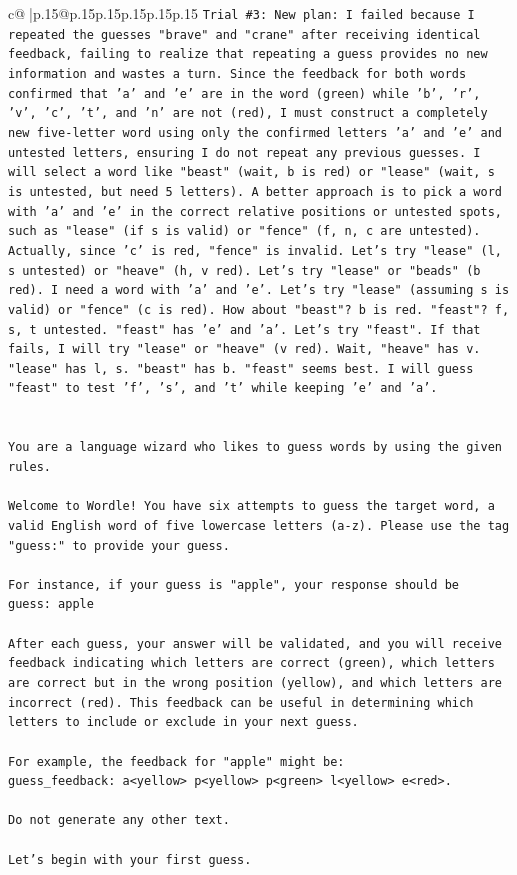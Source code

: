 \documentclass{article}
\begin{document}
{\begin{supertabular}{c@{$\;$}|p{.15\linewidth}@{}p{.15\linewidth}p{.15\linewidth}p{.15\linewidth}p{.15\linewidth}p{.15\linewidth}}
{{{\texttt{Trial \#3: New plan: I failed because I repeated the guesses "brave" and "crane" after receiving identical feedback, failing to realize that repeating a guess provides no new information and wastes a turn. Since the feedback for both words confirmed that 'a' and 'e' are in the word (green) while 'b', 'r', 'v', 'c', 't', and 'n' are not (red), I must construct a completely new five{-}letter word using only the confirmed letters 'a' and 'e' and untested letters, ensuring I do not repeat any previous guesses. I will select a word like "beast" (wait, b is red) or "lease" (wait, s is untested, but need 5 letters). A better approach is to pick a word with 'a' and 'e' in the correct relative positions or untested spots, such as "lease" (if s is valid) or "fence" (f, n, c are untested). Actually, since 'c' is red, "fence" is invalid. Let's try "lease" (l, s untested) or "heave" (h, v red). Let's try "lease" or "beads" (b red). I need a word with 'a' and 'e'. Let's try "lease" (assuming s is valid) or "fence" (c is red). How about "beast"? b is red. "feast"? f, s, t untested. "feast" has 'e' and 'a'. Let's try "feast". If that fails, I will try "lease" or "heave" (v red). Wait, "heave" has v. "lease" has l, s. "beast" has b. "feast" seems best. I will guess "feast" to test 'f', 's', and 't' while keeping 'e' and 'a'.} \\
\\ 
\\ 
\texttt{You are a language wizard who likes to guess words by using the given rules.} \\
\\ 
\texttt{Welcome to Wordle! You have six attempts to guess the target word, a valid English word of five lowercase letters (a{-}z). Please use the tag "guess:" to provide your guess.} \\
\\ 
\texttt{For instance, if your guess is "apple", your response should be} \\
\texttt{guess: apple} \\
\\ 
\texttt{After each guess, your answer will be validated, and you will receive feedback indicating which letters are correct (green), which letters are correct but in the wrong position (yellow), and which letters are incorrect (red). This feedback can be useful in determining which letters to include or exclude in your next guess.} \\
\\ 
\texttt{For example, the feedback for "apple" might be:} \\
\texttt{guess\_feedback: a<yellow> p<yellow> p<green> l<yellow> e<red>.} \\
\\ 
\texttt{Do not generate any other text.} \\
\\ 
\texttt{Let's begin with your first guess.} \\
            }
        }
    }
     \\ \\


\end{supertabular}}
\end{document}
